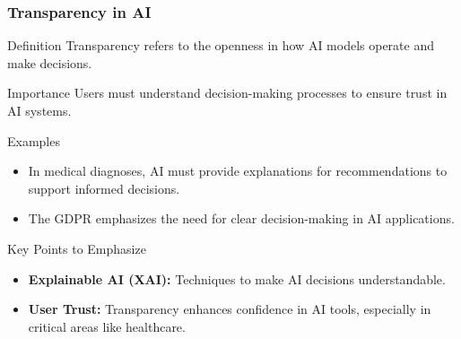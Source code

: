 \documentclass{beamer}
\begin{document}
\begin{frame}[fragile]
    \frametitle{Transparency in AI}
    \begin{block}{Definition}
        Transparency refers to the openness in how AI models operate and make decisions.
    \end{block}
    
    \begin{block}{Importance}
        Users must understand decision-making processes to ensure trust in AI systems.
    \end{block}

    \begin{block}{Examples}
        \begin{itemize}
            \item In medical diagnoses, AI must provide explanations for recommendations to support informed decisions.
            \item The GDPR emphasizes the need for clear decision-making in AI applications.
        \end{itemize}
    \end{block}

    \begin{block}{Key Points to Emphasize}
        \begin{itemize}
            \item \textbf{Explainable AI (XAI):} Techniques to make AI decisions understandable.
            \item \textbf{User Trust:} Transparency enhances confidence in AI tools, especially in critical areas like healthcare.
        \end{itemize}
    \end{block}
\end{frame}
\end{document}
